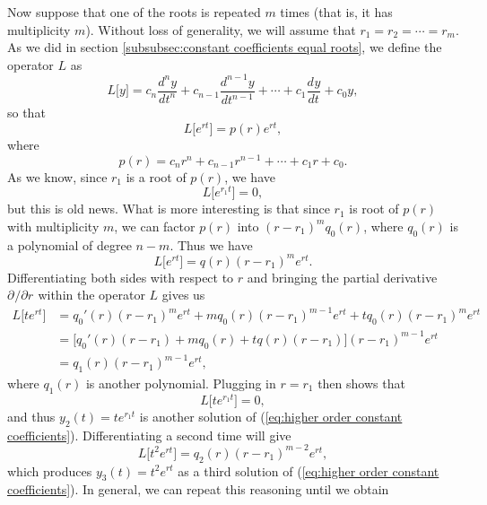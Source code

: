 \documentclass{myart}
\newcommand{\eq}[1]{(\ref{eq:#1})}
\newcommand{\deriv}[3][]{\frac{d^{#1}#2}{d#3^{#1}}}
\newcommand{\fpderiv}[3][]{\partial^{#1}#2/\partial#3^{#1}}
\begin{document}
Now suppose that one of the roots is repeated $m$ times (that is, it has multiplicity $m$). Without loss of generality, we will assume that $r_1 = r_2 = \cdots = r_m$. As we did in section \ref{subsubsec:constant coefficients equal roots}, we define the operator $L$ as
\begin{equation*}
L\big[y\big] = c_n \deriv[n]{y}{t} + c_{n-1} \deriv[n-1]{y}{t} + \cdots + c_1 \deriv{y}{t} + c_0 y,
\end{equation*}
so that
\begin{equation*}
L\big[e^{rt}\big] = p(r) e^{rt},
\end{equation*}
where
\begin{equation*}
p(r) = c_n r^n + c_{n-1} r^{n-1} + \cdots + c_1 r + c_0.
\end{equation*}
As we know, since $r_1$ is a root of $p(r)$, we have
\begin{equation*}
L\big[e^{r_1t}\big] = 0,
\end{equation*}
but this is old news. What is more interesting is that since $r_1$ is root of $p(r)$ with multiplicity $m$, we can factor $p(r)$ into $(r - r_1)^m q_0(r)$, where $q_0(r)$ is a polynomial of degree $n - m$. Thus we have
\begin{equation*}
L\big[e^{rt}\big] = q(r) (r - r_1)^m e^{rt}.
\end{equation*}
Differentiating both sides with respect to $r$ and bringing the partial derivative $\fpderiv{}{r}$ within the operator $L$ gives us
\begin{align*}
L\big[t e^{rt}\big] &= q_0'(r)(r - r_1)^m e^{rt} + m q_0(r)(r - r_1)^{m-1} e^{rt} + t q_0(r)(r - r_1)^m e^{rt} \\
&= \Big[q_0'(r)(r - r_1) + m q_0(r) + t q(r)(r - r_1)\Big](r - r_1)^{m-1} e^{rt} \\
&= q_1(r)(r - r_1)^{m-1} e^{rt},
\end{align*}
where $q_1(r)$ is another polynomial. Plugging in $r = r_1$ then shows that
\begin{equation*}
L\big[t e^{r_1t}\big] = 0,
\end{equation*}
and thus $y_2(t) = t e^{r_1t}$ is another solution of \eq{higher order constant coefficients}. Differentiating a second time will give
\begin{equation*}
L\big[t^2 e^{rt}\big] = q_2(r)(r - r_1)^{m-2} e^{rt},
\end{equation*}
which produces $y_3(t) = t^2 e^{rt}$ as a third solution of \eq{higher order constant coefficients}. In general, we can repeat this reasoning until we obtain
\end{document}
